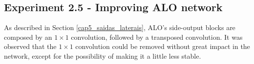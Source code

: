 
\subsection{Experiment 2.5 - Improving ALO network}
\label{ssec:bsds_subexp5}

% 

As described in Section \ref{cap5_saidas_laterais}, ALO's side-output blocks are composed by an $1 \times 1$ convolution, followed by a transposed convolution.
It was observed that the $1 \times 1$ convolution could be removed without great impact in the network, except for the possibility of making it a little less stable.

